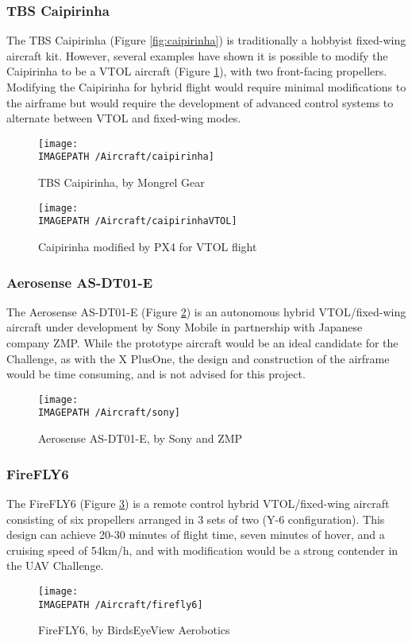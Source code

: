 \subsubsection*{TBS Caipirinha}
The TBS Caipirinha \cite{ref:caipirinha} (Figure \ref{fig:caipirinha}) is traditionally a hobbyist fixed-wing aircraft kit. However, several examples have shown it is possible to modify the Caipirinha to be a VTOL aircraft \cite{ref:caipirinhaVTOL} (Figure \ref{fig:caipirinhaVTOL}), with two front-facing propellers. Modifying the Caipirinha for hybrid flight would require minimal modifications to the airframe but would require the development of advanced control systems to alternate between VTOL and fixed-wing modes.

\begin{figure}[!ht]
	\centering
	\begin{minipage}{.5\textwidth}
		\centering
		\texttt{[image: \\IMAGEPATH /Aircraft/caipirinha]}
		\caption{TBS Caipirinha, by Mongrel Gear}
		\label{fig:caipirinha}
	\end{minipage}%
	\begin{minipage}{.5\textwidth}
		\centering
		\texttt{[image: \\IMAGEPATH /Aircraft/caipirinhaVTOL]}
		\caption{Caipirinha modified by PX4 for VTOL flight}
		\label{fig:caipirinhaVTOL}
	\end{minipage}
\end{figure}

\subsubsection*{Aerosense AS-DT01-E}
The Aerosense AS-DT01-E \cite{ref:sony} (Figure \ref{fig:sony}) is an autonomous hybrid VTOL/fixed-wing aircraft under development by Sony Mobile in partnership with Japanese company ZMP. While the prototype aircraft would be an ideal candidate for the Challenge, as with the X PlusOne, the design and construction of the airframe would be time consuming, and is not advised for this project.

\begin{figure}[!ht]
	\centering
	\texttt{[image: \\IMAGEPATH /Aircraft/sony]}
	\caption{Aerosense AS-DT01-E, by Sony and ZMP}
	\label{fig:sony}
\end{figure}

\subsubsection*{FireFLY6}
The FireFLY6 \cite{ref:firefly6} (Figure \ref{fig:firefly6}) is a remote control hybrid VTOL/fixed-wing aircraft consisting of six propellers arranged in 3 sets of two (Y-6 configuration). This design can achieve 20-30 minutes of flight time, seven minutes of hover, and a cruising speed of 54km/h, and with modification would be a strong contender in the UAV Challenge.

\begin{figure}[!h]
	\centering
	\texttt{[image: \\IMAGEPATH /Aircraft/firefly6]}
	\caption{FireFLY6, by BirdsEyeView Aerobotics}
	\label{fig:firefly6}
\end{figure}